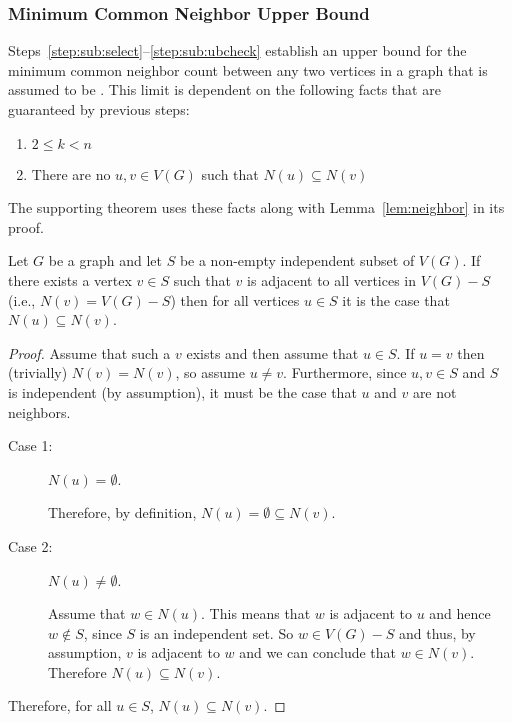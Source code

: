 \subsubsection{Minimum Common Neighbor Upper Bound}\label{sec:sub:sub:common}

Steps~\ref{step:sub:select}--\ref{step:sub:ubcheck} establish an upper bound for the minimum common neighbor count
between any two vertices in a graph that is assumed to be .  This limit is dependent on the following
facts that are guaranteed by previous steps:

\begin{enumerate}
\item \(2\le k<n\)
\item There are no \(u,v\in V(G)\) such that \(N(u)\subseteq N(v)\)
\end{enumerate}

The supporting theorem uses these facts along with Lemma~\ref{lem:neighbor} in its proof.

\begin{lemma}
  \label{lem:neighbor}
  Let \(G\) be a graph and let \(S\) be a non-empty independent subset of \(V(G)\).  If there exists a vertex
  \(v\in S\) such that \(v\) is adjacent to all vertices in \(V(G)-S\) (i.e., \(N(v)=V(G)-S\)) then for all
  vertices \(u\in S\) it is the case that \(N(u)\subseteq N(v)\).
\end{lemma}

\begin{proof}
  Assume that such a \(v\) exists and then assume that \(u\in S\).  If \(u=v\) then (trivially) \(N(v)=N(v)\), so
  assume \(u\ne v\).  Furthermore, since \(u,v\in S\) and \(S\) is independent (by assumption), it must be the case
  that \(u\) and \(v\) are not neighbors.

  \begin{description}
  \item[Case 1:] \(N(u)=\emptyset\).
      
    Therefore, by definition, \(N(u)=\emptyset\subseteq N(v)\).

  \item[Case 2:] \(N(u)\ne\emptyset\).

    Assume that \(w\in N(u)\).  This means that \(w\) is adjacent to \(u\) and hence \(w\notin S\), since \(S\) is
    an independent set.  So \(w\in V(G)-S\) and thus, by assumption, \(v\) is adjacent to \(w\) and we can conclude
    that \(w\in N(v)\).  Therefore \(N(u)\subseteq N(v)\).
  \end{description}

  Therefore, for all \(u\in S\), \(N(u)\subseteq N(v)\).
\end{proof}

